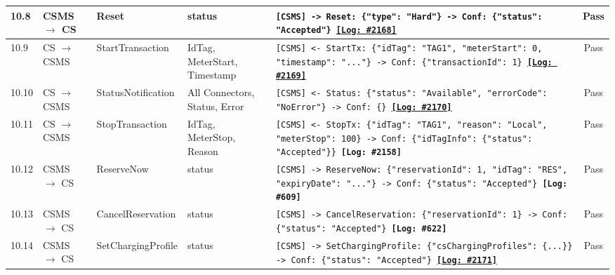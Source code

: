 \documentclass[10pt, a4paper, landscape]{article}
\begin{document}
\begin{longtable}{|p{1.0cm}|p{2.5cm}|p{4.0cm}|p{5.0cm}|p{10.0cm}|c|}
\hline
10.8 & CSMS $\to$ CS & Reset & status & \footnotesize\texttt{[CSMS] -> Reset: \{"type": "Hard"\} \newline [CS] -> Conf: \{"status": "Accepted"\} \newline \hyperref[log:10.8]{\textbf{[Log: \#2168]}}} & Pass \\
\hline
10.9 & CS $\to$ CSMS & StartTransaction & IdTag, MeterStart, Timestamp & \footnotesize\texttt{[CSMS] <- StartTx: \{"idTag": "TAG1", "meterStart": 0, "timestamp": "..."\} \newline [CSMS] -> Conf: \{"transactionId": 1\} \newline \hyperref[log:10.9]{\textbf{[Log: \#2169]}}} & Pass \\
\hline
10.10 & CS $\to$ CSMS & StatusNotification & All Connectors, Status, Error & \footnotesize\texttt{[CSMS] <- Status: \{"status": "Available", "errorCode": "NoError"\} \newline [CSMS] -> Conf: \{\} \newline \hyperref[log:10.10]{\textbf{[Log: \#2170]}}} & Pass \\
\hline
10.11 & CS $\to$ CSMS & StopTransaction & IdTag, MeterStop, Reason & \footnotesize\texttt{[CSMS] <- StopTx: \{"idTag": "TAG1", "reason": "Local", "meterStop": 100\} \newline [CSMS] -> Conf: \{"idTagInfo": \{"status": "Accepted"\}\} \newline \textbf{[Log: \#2158]}} & Pass \\
\hline
10.12 & CSMS $\to$ CS & ReserveNow & status & \footnotesize\texttt{[CSMS] -> ReserveNow: \{"reservationId": 1, "idTag": "RES", "expiryDate": "..."\} \newline [CS] -> Conf: \{"status": "Accepted"\} \newline \textbf{[Log: \#609]}} & Pass \\
\hline
10.13 & CSMS $\to$ CS & CancelReservation & status & \footnotesize\texttt{[CSMS] -> CancelReservation: \{"reservationId": 1\} \newline [CS] -> Conf: \{"status": "Accepted"\} \newline \textbf{[Log: \#622]}} & Pass \\
\hline
10.14 & CSMS $\to$ CS & SetChargingProfile & status & \footnotesize\texttt{[CSMS] -> SetChargingProfile: \{"csChargingProfiles": \{...\}\} \newline [CS] -> Conf: \{"status": "Accepted"\} \newline \hyperref[log:10.14]{\textbf{[Log: \#2171]}}} & Pass \\

\end{longtable}
\end{document}

